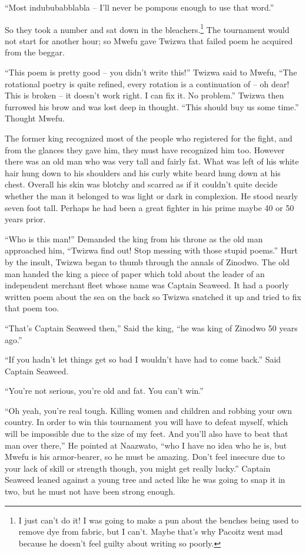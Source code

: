 ``Most indububabblabla -- I'll never be pompous enough to use that word.''

\tbreak

So they took a number and sat down in the bleachers.\footnote{I just can't do it! I was going to make a pun about the benches being used to remove dye from fabric, but I can't. Maybe that's why Pacoitz went mad because he doesn't feel guilty about writing so poorly.} The tournament would not start for another hour; so Mwefu gave Twizwa that failed poem he acquired from the beggar.

``This poem is pretty good -- you didn't write this!'' Twizwa said to Mwefu, ``The rotational poetry is quite refined, every rotation is a continuation of -- oh dear! This is broken -- it doesn't work right. I can fix it. No problem.'' Twizwa then furrowed his brow and was lost deep in thought. ``This should buy us some time.'' Thought Mwefu.

The former king recognized most of the people who registered for the fight, and from the glances they gave him, they must have recognized him too. However there was an old man who was very tall and fairly fat. What was left of his white hair hung down to his shoulders and his curly white beard hung down at his chest. Overall his skin was blotchy and scarred as if it couldn't quite decide whether the man it belonged to was light or dark in complexion. He stood nearly seven foot tall. Perhaps he had been a great fighter in his prime maybe 40 or 50 years prior.

``Who is this man!'' Demanded the king from his throne as the old man approached him, ``Twizwa find out! Stop messing with those stupid poems.'' Hurt by the insult, Twizwa began to thumb through the annals of Zinodwo. The old man handed the king a piece of paper which told about the leader of an independent merchant fleet whose name was Captain Seaweed. It had a poorly written poem about the sea on the back so Twizwa snatched it up and tried to fix that poem too.

``That's Captain Seaweed then,'' Said the king, ``he was king of Zinodwo 50 years ago.''

``If you hadn't let things get so bad I wouldn't have had to come back.'' Said Captain Seaweed.

``You're not serious, you're old and fat. You can't win.''

``Oh yeah, you're real tough. Killing women and children and robbing your own country. In order to win this tournament you will have to defeat myself, which will be impossible due to the size of my feet. And you'll also have to beat that man over there,'' He pointed at Naazwato, ``who I have no idea who he is, but Mwefu is his armor-bearer, so he must be amazing. Don't feel insecure due to your lack of skill or strength though, you might get really lucky.'' Captain Seaweed leaned against a young tree and acted like he was going to snap it in two, but he must not have been strong enough.

